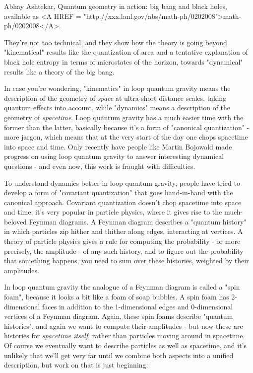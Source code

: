 Abhay Ashtekar, Quantum geometry in action: big bang and black holes, 
available as 
<A HREF = "http://xxx.lanl.gov/abs/math-ph/0202008">math-ph/0202008</A>.

They're not too technical, and they show how the theory is going beyond
"kinematical" results like the quantization of area and a
tentative explanation of black hole entropy in terms of microstates of
the horizon, towards "dynamical" results like a theory of the
big bang.

In case you're wondering, "kinematics" in loop quantum gravity
means the description of the geometry of \emph{space} at ultra-short distance
scales, taking quantum effects into account, while "dynamics"
means a description of the geometry of \emph{spacetime}.  Loop quantum
gravity has a much easier time with the former than the latter,
basically because it's a form of "canonical quantization" -
more jargon, which means that at the very start of the day one chops
spacetime into space and time.  Only recently have people like Martin
Bojowald made progress on using loop quantum gravity to answer
interesting dynamical questions - and even now, this work is fraught
with difficulties.

To understand dynamics better in loop quantum gravity, people have tried
to develop a form of "covariant quantization" that goes
hand-in-hand with the canonical approach.  Covariant quantization
doesn't chop spacetime into space and time; it's very popular in
particle physics, where it gives rise to the much-beloved Feynman
diagrams.  A Feynman diagram describes a "quantum history" in
which particles zip hither and thither along edges, interacting at
vertices.  A theory of particle physics gives a rule for computing the
probability - or more precisely, the amplitude - of any such history,
and to figure out the probability that something happens, you need to
sum over these histories, weighted by their amplitudes.

In loop quantum gravity the analogue of a Feynman diagram is called a
"spin foam", because it looks a bit like a foam of soap
bubbles.  A spin foam has 2-dimensional faces in addition to the
1-dimensional edges and 0-dimensional vertices of a Feynman diagram.
Again, these spin foams describe "quantum histories", and
again we want to compute their amplitudes - but now these are histories
for \emph{spacetime itself}, rather than particles moving around in
spacetime.  Of course we eventually want to describe particles as well
as spacetime, and it's unlikely that we'll get very far until we combine
both aspects into a unified description, but work on that is just
beginning:

